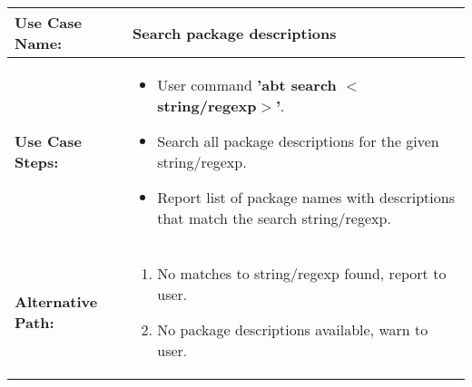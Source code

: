 \medskip

\begin{tabularx}{\linewidth}{|l|X|}
\hline
\textbf{Use Case Name:} & \textbf{Search package descriptions} \\
\hline
\textbf{Use Case Steps:} & 
\begin{minipage}{\linewidth} 
  \vspace{0.05em}
  \begin{itemize}
    \item User command \textbf{'abt search $<$string/regexp$>$'}.
    \item Search all package descriptions for the given string/regexp.
    \item Report list of package names with descriptions that match the search string/regexp.
  \end{itemize}
  \vspace{0.05em}
\end{minipage}
\\
\hline 
\textbf{Alternative Path:} &
\begin{minipage}{\linewidth}
  \vspace{0.05em} 
  \begin{enumerate}
    \item No matches to string/regexp found, report to user.
    \item No package descriptions available, warn to user.
  \end{enumerate}
  \vspace{0.05em} 
\end{minipage}
\\
\hline
\end{tabularx}
